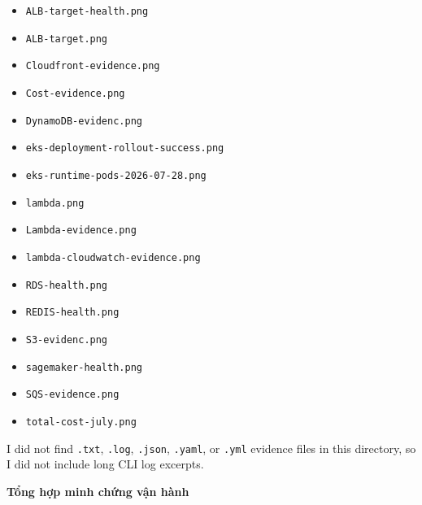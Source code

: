\begin{itemize}
\tightlist
\item
  \texttt{ALB-\allowbreak{}target-\allowbreak{}health.\allowbreak{}png}
\item
  \texttt{ALB-\allowbreak{}target.\allowbreak{}png}
\item
  \texttt{Cloudfront-\allowbreak{}evidence.\allowbreak{}png}
\item
  \texttt{Cost-\allowbreak{}evidence.\allowbreak{}png}
\item
  \texttt{DynamoDB-\allowbreak{}evidenc.\allowbreak{}png}
\item
  \texttt{eks-\allowbreak{}deployment-\allowbreak{}rollout-\allowbreak{}success.\allowbreak{}png}
\item
  \texttt{eks-\allowbreak{}runtime-\allowbreak{}pods-\allowbreak{}2026-\allowbreak{}07-\allowbreak{}28.\allowbreak{}png}
\item
  \texttt{lambda.\allowbreak{}png}
\item
  \texttt{Lambda-\allowbreak{}evidence.\allowbreak{}png}
\item
  \texttt{lambda-\allowbreak{}cloudwatch-\allowbreak{}evidence.\allowbreak{}png}
\item
  \texttt{RDS-\allowbreak{}health.\allowbreak{}png}
\item
  \texttt{REDIS-\allowbreak{}health.\allowbreak{}png}
\item
  \texttt{S3-\allowbreak{}evidenc.\allowbreak{}png}
\item
  \texttt{sagemaker-\allowbreak{}health.\allowbreak{}png}
\item
  \texttt{SQS-\allowbreak{}evidence.\allowbreak{}png}
\item
  \texttt{total-\allowbreak{}cost-\allowbreak{}july.\allowbreak{}png}
\end{itemize}

I did not find \texttt{.\allowbreak{}txt}, \texttt{.\allowbreak{}log}, \texttt{.\allowbreak{}json},
\texttt{.\allowbreak{}yaml}, or \texttt{.\allowbreak{}yml} evidence files in this directory, so I
did not include long CLI log excerpts.

\vspace{0.5em}\noindent\textbf{Tổng hợp minh chứng vận
hành}\par

